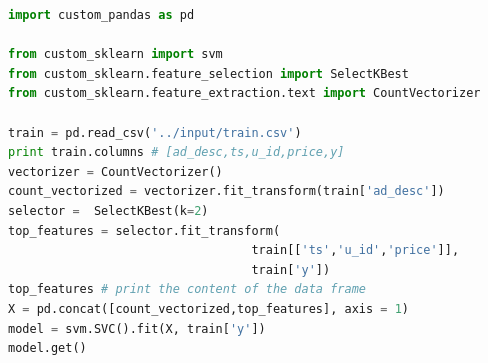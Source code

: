 \begin{lstlisting}[language=Python, caption=Example script,captionpos=b,label = {listing-experiment-graph}]
import custom_pandas as pd

from custom_sklearn import svm
from custom_sklearn.feature_selection import SelectKBest
from custom_sklearn.feature_extraction.text import CountVectorizer

train = pd.read_csv('../input/train.csv') 
print train.columns # [ad_desc,ts,u_id,price,y]
vectorizer = CountVectorizer()
count_vectorized = vectorizer.fit_transform(train['ad_desc'])
selector =  SelectKBest(k=2)
top_features = selector.fit_transform(
                                  train[['ts','u_id','price']],  
                                  train['y'])
top_features # print the content of the data frame			     
X = pd.concat([count_vectorized,top_features], axis = 1)
model = svm.SVC().fit(X, train['y'])
model.get()
\end{lstlisting}

